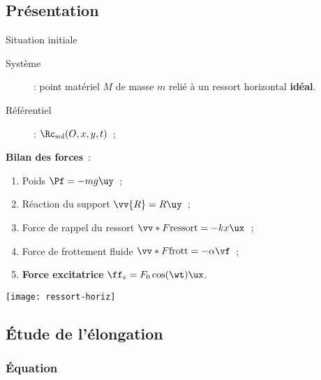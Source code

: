 \documentclass[../main/main.tex]{subfiles}
\begin{document}
\subsection{Présentation}
\begin{rdefi}{Situation initiale}
    \begin{description}
        \item[Système] : point matériel $M$ de masse $m$ relié à un ressort
            horizontal \textbf{idéal}.
        \item[Référentiel] : $\Rc_{\rm sol} (O,x,y,t)$~;
    \end{description}

    \bigbreak

    \begin{minipage}{0.55\linewidth}
        \textbf{Bilan des forces}~:
        \begin{enumerate}
            \item Poids $\Pf = -mg\uy$~;
            \item Réaction du support $\vv{R} = R\uy$~;
            \item Force de rappel du ressort $\vv*{F}{\rm ressort} = -kx\ux$~;
            \item Force de frottement fluide $\vv*{F}{\rm frott} = -\alpha\vf$~;
            \item \textbf{Force excitatrice} $\ff_e = F_0\cos(\wt)\ux$.
        \end{enumerate}
    \end{minipage}
    \begin{minipage}{0.45\linewidth}
        \begin{center}
            \texttt{[image: ressort-horiz]}
        \end{center}
    \end{minipage}

\end{rdefi}

\subsection{Étude de l'élongation}
\subsubsection{Équation}
\end{document}
